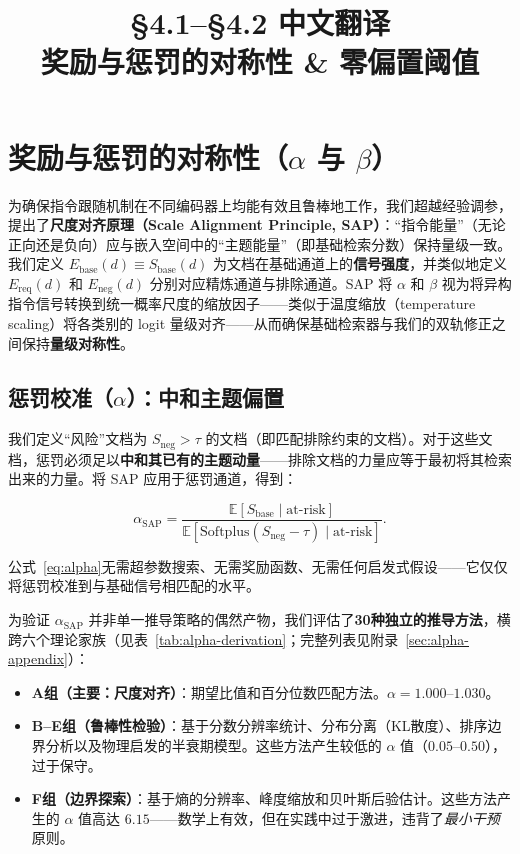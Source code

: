 \documentclass[12pt,a4paper]{article}
\begin{document}
\title{§4.1--§4.2 中文翻译\\
\large 奖励与惩罚的对称性 \& 零偏置阈值}

\date{}
\maketitle

\section{奖励与惩罚的对称性（$\alpha$ 与 $\beta$）}

为确保指令跟随机制在不同编码器上均能有效且鲁棒地工作，我们超越经验调参，提出了\textbf{尺度对齐原理（Scale Alignment Principle, SAP）}：“指令能量”（无论正向还是负向）应与嵌入空间中的“主题能量”（即基础检索分数）保持量级一致。我们定义 $E_{\text{base}}(d) \equiv S_{\text{base}}(d)$ 为文档在基础通道上的\textbf{信号强度}，并类似地定义 $E_{\text{req}}(d)$ 和 $E_{\text{neg}}(d)$ 分别对应精炼通道与排除通道。SAP 将 $\alpha$ 和 $\beta$ 视为将异构指令信号转换到统一概率尺度的缩放因子——类似于温度缩放（temperature scaling）将各类别的 logit 量级对齐——从而确保基础检索器与我们的双轨修正之间保持\textbf{量级对称性}。

\subsection{惩罚校准（$\alpha$）：中和主题偏置}

我们定义“风险”文档为 $S_{\text{neg}} > \tau$ 的文档（即匹配排除约束的文档）。对于这些文档，惩罚必须足以\textbf{中和其已有的主题动量}——排除文档的力量应等于最初将其检索出来的力量。将 SAP 应用于惩罚通道，得到：

\begin{equation}
  \alpha_{\text{SAP}} =
    \frac{\mathbb{E}[S_{\text{base}} \mid \text{at-risk}]}
         {\mathbb{E}[\text{Softplus}(S_{\text{neg}} - \tau) \mid
         \text{at-risk}]}.
  \label{eq:alpha}
\end{equation}

公式~\eqref{eq:alpha}无需超参数搜索、无需奖励函数、无需任何启发式假设——它仅仅将惩罚校准到与基础信号相匹配的水平。

为验证 $\alpha_{\text{SAP}}$ 并非单一推导策略的偶然产物，我们评估了\textbf{30种独立的推导方法}，横跨六个理论家族（见表~\ref{tab:alpha-derivation}；完整列表见附录~\ref{sec:alpha-appendix}）：

\begin{itemize}
  \item \textbf{A组（主要：尺度对齐）}：期望比值和百分位数匹配方法。$\alpha = 1.000$--$1.030$。
  \item \textbf{B--E组（鲁棒性检验）}：基于分数分辨率统计、分布分离（KL散度）、排序边界分析以及物理启发的半衰期模型。这些方法产生较低的 $\alpha$ 值（$0.05$--$0.50$），过于保守。
  \item \textbf{F组（边界探索）}：基于熵的分辨率、峰度缩放和贝叶斯后验估计。这些方法产生的 $\alpha$ 值高达 $6.15$——数学上有效，但在实践中过于激进，违背了\textit{最小干预}原则。
\end{itemize}
\end{document}
